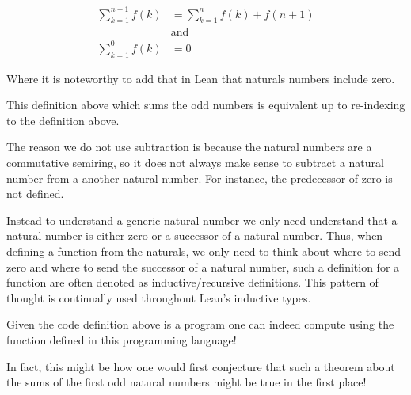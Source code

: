 \begin{example}
    \begin{align*}
        \sum_{k = 1}^{n + 1} f(k) &= \sum_{k = 1}^{n} f(k) + f(n + 1) \tag{for $n \geq 0$}\\
            &\text{and}\\
        \sum_{k = 1}^{0} f(k) &= 0
    \end{align*}

    Where it is noteworthy to add that in Lean that naturals numbers include zero.

    This definition above which sums the odd numbers is equivalent up to re-indexing to the definition above. 
    
    The reason we do not use subtraction is because the natural numbers are a commutative semiring, so 
    it does not always make sense to subtract a natural number from a another natural number. For instance, the predecessor of
    zero is not defined. 
    
    Instead to understand a generic natural number we only need understand that a natural number is either zero or a successor of a natural number.
    Thus, when defining a function from the naturals,
    we only need to think about where to send zero and where to send the successor of a natural number, such a definition for a function
    are often denoted as inductive/recursive definitions. This pattern of thought is continually used throughout Lean's inductive types.

    Given the code definition above is a program one can indeed compute using the
    function defined in this programming language!

    In fact, this might be how one would first conjecture that such a theorem about 
    the sums of the first odd natural numbers might be true in the first place!




\end{example}
